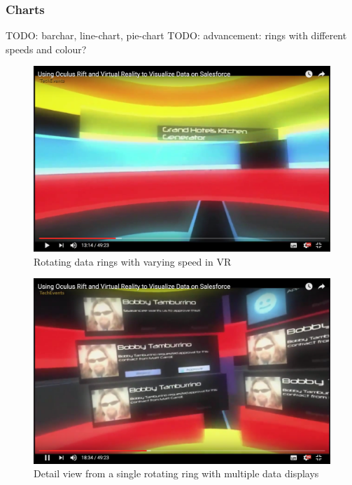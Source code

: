 \subsubsection{Charts}

TODO: barchar, line-chart, pie-chart
TODO: advancement: rings with different speeds and colour?
\cite{CodeScience2015}


\begin{figure}[h]
	\begin{center}
		\includegraphics[width=14cm]{03_Figures/05_LitReview/CodeScience2015.png}
		\caption[Rotating data rings with varying speed in VR]{Rotating data rings with varying speed in VR \citep{CodeScience2015}}
		\label{fig:rotatingrings}
	\end{center}
\end{figure}


\begin{figure}[h]
	\begin{center}
		\includegraphics[width=14cm]{03_Figures/05_LitReview/CodeScience2015a.png}
		\caption[Detail view from a single rotating ring with multiple data displays]{Detail view from a single rotating ring with multiple data displays \citep{CodeScience2015}}
		\label{fig:rotatingringsdetail}
	\end{center}
\end{figure}


